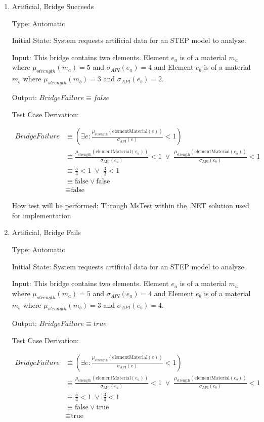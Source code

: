 \documentclass[12pt, titlepage]{article}
\begin{document}
\begin{enumerate}

\item{Artificial, Bridge Succeeds\\}

Type: Automatic
					
Initial State: System requests artificial data for an STEP model to analyze.
					
Input: This bridge contains two elements. Element $e_a$ is of a material $m_a$ where $\mu_{strength}(m_a) = 5$ and 
$\sigma_{API}(e_a) = 4 $ and Element $e_b$ is of a material $m_b$ where $\mu_{strength}(m_b) = 3$ and 
$\sigma_{API}(e_b) = 2 $.
					
Output: $BridgeFailure \equiv false$

Test Case Derivation: 

\begin{align*}
BridgeFailure &\equiv (\exists e: \frac{\mu_{\text{strength}}(\text{elementMaterial}(e))}{\sigma_{\text{API}}(e)} < 1) \\
              &\equiv \frac{\mu_{\text{strength}}(\text{elementMaterial}(e_a))}{\sigma_{\text{API}}(e_a)} < 1 \; \lor \; \frac{\mu_{\text{strength}}(\text{elementMaterial}(e_b))}{\sigma_{\text{API}}(e_b)} < 1 \\
              &\equiv \frac{5}{4} < 1 \; \lor \; \frac{3}{2} < 1 \\
              &\equiv \text{false} \lor \text{false} \\
              &\equiv \text{false}
\end{align*}

How test will be performed: Through MsTest within the .NET solution used for implementation

\item{Artificial, Bridge Fails\\}

Type: Automatic
					
Initial State: System requests artificial data for an STEP model to analyze.
					
Input: This bridge contains two elements. Element $e_a$ is of a material $m_a$ where $\mu_{strength}(m_a) = 5$ and 
$\sigma_{API}(e_a) = 4 $ and Element $e_b$ is of a material $m_b$ where $\mu_{strength}(m_b) = 3$ and 
$\sigma_{API}(e_b) = 4 $.
					
Output: $BridgeFailure \equiv true$

Test Case Derivation: 

\begin{align*}
BridgeFailure &\equiv (\exists e: \frac{\mu_{\text{strength}}(\text{elementMaterial}(e))}{\sigma_{\text{API}}(e)} < 1) \\
              &\equiv \frac{\mu_{\text{strength}}(\text{elementMaterial}(e_a))}{\sigma_{\text{API}}(e_a)} < 1 \; \lor \; \frac{\mu_{\text{strength}}(\text{elementMaterial}(e_b))}{\sigma_{\text{API}}(e_b)} < 1 \\
              &\equiv \frac{5}{4} < 1 \; \lor \; \frac{3}{4} < 1 \\
              &\equiv \text{false} \lor \text{true} \\
              &\equiv \text{true}
\end{align*}


\end{enumerate}
\end{document}
